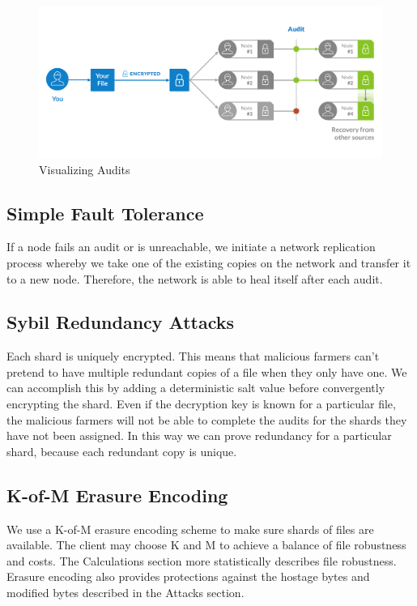 \documentclass[a4paper,10pt]{article}
\begin{document}
\begin{figure}[hbt]
\centering
\includegraphics[width=\linewidth]{5}
\caption{Visualizing Audits}
\end{figure}

\subsection{Simple Fault Tolerance}
If a node fails an audit or is unreachable, we initiate a network replication process whereby we take one of the existing copies on the network and transfer it to a new node. Therefore, the network is able to heal itself after each audit.\\

\subsection{Sybil Redundancy Attacks}
Each shard is uniquely encrypted. This means that malicious farmers can’t pretend to have multiple redundant copies of a file when they only have one. We can accomplish this by adding a deterministic salt value before convergently encrypting the shard. Even if the decryption key is known for a particular file, the malicious farmers will not be able to complete the audits for the shards they have not been assigned. In this way we can prove redundancy for a particular shard, because each redundant copy is unique.\\

\subsection{K-of-M Erasure Encoding}
We use a K-of-M erasure encoding scheme to make sure shards of files are available. The client may choose K and M to achieve a balance of file robustness and costs. The Calculations section more statistically describes file robustness. Erasure encoding also provides protections against the hostage bytes and modified bytes described in the Attacks section.\\
\end{document}
